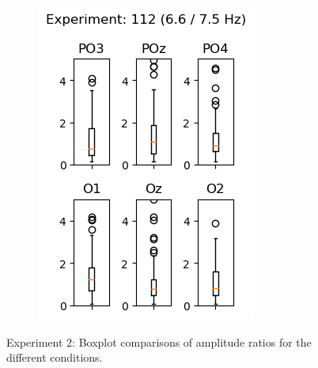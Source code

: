 \begin{figure}[ht]
\begin{subfigure}{0.3\textwidth}
        \includegraphics[width=\linewidth]{images/results/1126675.png}
        \label{fig:1126675}
    \end{subfigure}
    \caption{Experiment 2: Boxplot comparisons of amplitude ratios for the different conditions.}
    \label{fig:2-66/75}
\end{figure}


